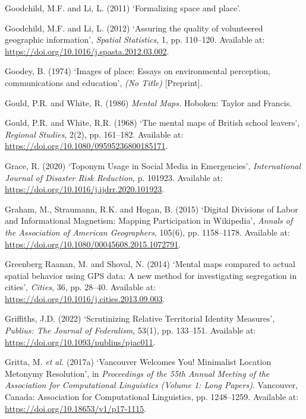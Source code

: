 \documentclass[
  letterpaper,
  11pt,
  english,
  onehalfspacing,
  headsepline]{MastersDoctoralThesis}
\newlength{\cslhangindent}
\newlength{\cslentryspacingunit} %
\newenvironment{CSLReferences}[2] %
 {%
  \setlength{\parindent}{0pt}
  \ifodd #1
  \let\oldpar\par
  \def\par{\hangindent=\cslhangindent\oldpar}
  \fi
  \setlength{\parskip}{#2\cslentryspacingunit}
 }%
 {}
\begin{document}
\begin{CSLReferences}{0}{0}
\leavevmode{}%
Goodchild, M.F. and Li, L. (2011) {`Formalizing space and place'}.

\leavevmode{}%
Goodchild, M.F. and Li, L. (2012) {`Assuring the quality of volunteered
geographic information'}, \emph{Spatial Statistics}, 1, pp. 110--120.
Available at: \url{https://doi.org/10.1016/j.spasta.2012.03.002}.

\leavevmode{}%
Goodey, B. (1974) {`Images of place: Essays on environmental perception,
communications and education'}, \emph{(No Title)} {[}Preprint{]}.

\leavevmode{}%
Gould, P.R. and White, R. (1986) \emph{Mental {Maps}.} {Hoboken}:
{Taylor and Francis}.

\leavevmode{}%
Gould, P.R. and White, R.R. (1968) {`The mental maps of {British} school
leavers'}, \emph{Regional Studies}, 2(2), pp. 161--182. Available at:
\url{https://doi.org/10.1080/09595236800185171}.

\leavevmode{}%
Grace, R. (2020) {`Toponym {Usage} in {Social Media} in {Emergencies}'},
\emph{International Journal of Disaster Risk Reduction}, p. 101923.
Available at: \url{https://doi.org/10.1016/j.ijdrr.2020.101923}.

\leavevmode{}%
Graham, M., Straumann, R.K. and Hogan, B. (2015) {`Digital {Divisions}
of {Labor} and {Informational Magnetism}: {Mapping Participation} in
{Wikipedia}'}, \emph{Annals of the Association of American Geographers},
105(6), pp. 1158--1178. Available at:
\url{https://doi.org/10.1080/00045608.2015.1072791}.

\leavevmode{}%
Greenberg Raanan, M. and Shoval, N. (2014) {`Mental maps compared to
actual spatial behavior using {GPS} data: {A} new method for
investigating segregation in cities'}, \emph{Cities}, 36, pp. 28--40.
Available at: \url{https://doi.org/10.1016/j.cities.2013.09.003}.

\leavevmode{}%
Griffiths, J.D. (2022) {`Scrutinizing {Relative Territorial Identity
Measures}'}, \emph{Publius: The Journal of Federalism}, 53(1), pp.
133--151. Available at: \url{https://doi.org/10.1093/publius/pjac011}.

\leavevmode{}%
Gritta, M. \emph{et al.} (2017a) {`Vancouver {Welcomes You}! {Minimalist
Location Metonymy Resolution}'}, in \emph{Proceedings of the 55th
{Annual Meeting} of the {Association} for {Computational Linguistics}
({Volume} 1: {Long Papers})}. {Vancouver, Canada}: {Association for
Computational Linguistics}, pp. 1248--1259. Available at:
\url{https://doi.org/10.18653/v1/p17-1115}.


\end{CSLReferences}
\end{document}
